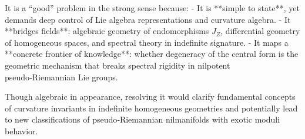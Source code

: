 It is a “good” problem in the strong sense because:
- It is **simple to state**, yet demands deep control of Lie algebra representations and curvature algebra.  
- It **bridges fields**: algebraic geometry of endomorphisms \( J_Z \), differential geometry of homogeneous spaces, and spectral theory in indefinite signature.  
- It maps a **concrete frontier of knowledge**: whether degeneracy of the central form is the geometric mechanism that breaks spectral rigidity in nilpotent pseudo‑Riemannian Lie groups.  

Though algebraic in appearance, resolving it would clarify fundamental concepts of curvature invariants in indefinite homogeneous geometries and potentially lead to new classifications of pseudo‑Riemannian nilmanifolds with exotic moduli behavior.